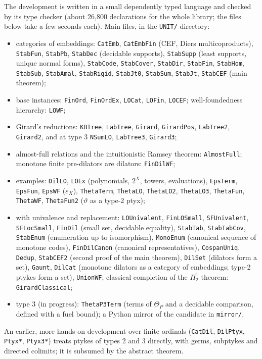 \documentclass[11pt]{article}
\theoremstyle{definition}
\theoremstyle{remark}
\begin{document}
The development is written in a small dependently typed language and
checked by its type checker (about 26{,}800 declarations for the whole
library; the files below take a few seconds each). Main files, in the
\texttt{UNIT/} directory:
\begin{itemize}
\item categories of embeddings: \texttt{CatEmb}, \texttt{CatEmbFin} (CEF,
  Diers multicoproducts), \texttt{StabFun}, \texttt{StabPb},
  \texttt{StabDec} (decidable supports), \texttt{StabSupp} (least supports,
  unique normal forms), \texttt{StabCode}, \texttt{StabCover},
  \texttt{StabDir}, \texttt{StabFin}, \texttt{StabHom}, \texttt{StabSub},
  \texttt{StabAmal}, \texttt{StabRigid}, \texttt{StabJt0},
  \texttt{StabSum}, \texttt{StabJt}, \texttt{StabCEF} (main theorem);
\item base instances: \texttt{FinOrd}, \texttt{FinOrdEx},
  \texttt{LOCat}, \texttt{LOFin}, \texttt{LOCEF};
  well-foundedness hierarchy: \texttt{LOWF};
\item Girard's reductions: \texttt{KBTree}, \texttt{LabTree},
  \texttt{Girard}, \texttt{GirardPos}, \texttt{LabTree2}, \texttt{Girard2},
  and at type 3 \texttt{NSumLO}, \texttt{LabTree3}, \texttt{Girard3};
\item almost-full relations and the intuitionistic Ramsey theorem:
  \texttt{AlmostFull}; monotone finite pre-dilators are dilators:
  \texttt{FinDilWF};
\item examples: \texttt{DilLO}, \texttt{LOEx} (polynomials, $2^X$,
  towers, evaluations), \texttt{EpsTerm}, \texttt{EpsFun}, \texttt{EpsWF}
  ($\varepsilon_X$), \texttt{ThetaTerm}, \texttt{ThetaLO},
  \texttt{ThetaLO2}, \texttt{ThetaLO3}, \texttt{ThetaFun},
  \texttt{ThetaWF}, \texttt{ThetaFun2} ($\vartheta$ as a type-2 ptyx);
\item with univalence and replacement: \texttt{LOUnivalent},
  \texttt{FinLOSmall}, \texttt{SFUnivalent}, \texttt{SFLocSmall},
  \texttt{FinDil} (small set, decidable equality), \texttt{StabTab},
  \texttt{StabTabCov}, \texttt{StabEnum} (enumeration up to isomorphism),
  \texttt{MonoEnum} (canonical sequence of monotone codes),
  \texttt{FinDilCanon} (canonical representatives), \texttt{CospanUniq},
  \texttt{Dedup}, \texttt{StabCEF2} (second proof of the main theorem),
  \texttt{DilSet} (dilators form a set), \texttt{Gaunt}, \texttt{DilCat}
  (monotone dilators as a category of embeddings; type-2 ptykes form a set),
  \texttt{UnionWF}; classical completion of the $\Pi^1_2$ theorem:
  \texttt{GirardClassical};
\item type 3 (in progress): \texttt{ThetaP3Term} (terms of $\Theta_P$ and a
  decidable comparison, defined with a fuel bound); a Python mirror of the candidate in
  \texttt{mirror/}.
\end{itemize}
An earlier, more hands-on development over finite ordinals
(\texttt{CatDil}, \texttt{DilPtyx}, \texttt{Ptyx*}, \texttt{Ptyx3*}) treats
ptykes of types 2 and 3 directly, with germs, subptykes and directed
colimits; it is subsumed by the abstract theorem.
\end{document}
